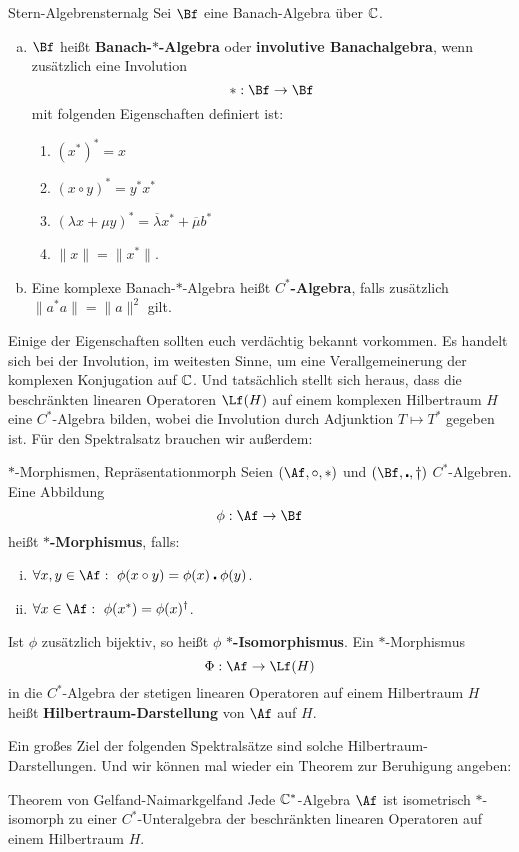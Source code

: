 \begin{definition}{Stern-Algebren}{sternalg}
Sei $\Bf$ eine Banach-Algebra über $\mathbb{C}$.
\begin{enumerate}[(a)]
\item $\Bf$ heißt \textbf{Banach-$\ast$-Algebra} oder \textbf{involutive Banachalgebra}, wenn zusätzlich eine Involution \[ \ast: \Bf \to \Bf \] mit folgenden Eigenschaften definiert ist:
	\begin{enumerate}[({*}1)]
		\item $(x^\ast)^\ast = x$
		\item $(x \circ y)^\ast = y^\ast x^\ast$
		\item $(\lambda x + \mu y)^\ast = \overline{\lambda} x^\ast + \overline{\mu} b^\ast$
		\item $\|x\|=\|x^\ast\|$.
	\end{enumerate}
\item Eine komplexe Banach-$\ast$-Algebra heißt \textbf{$C^\ast$-Algebra}, falls zusätzlich $\|a^\ast a\| = \|a\|^2$ gilt.
\end{enumerate}
\end{definition}
Einige der Eigenschaften sollten euch verdächtig bekannt vorkommen. Es handelt sich bei der Involution, im weitesten Sinne, um eine Verallgemeinerung der komplexen Konjugation auf $\mathbb{C}$. Und tatsächlich stellt sich heraus, dass die beschränkten linearen Operatoren $\Lf(H)$ auf einem komplexen Hilbertraum $H$ eine $C^\ast$-Algebra bilden, wobei die Involution durch Adjunktion $T \mapsto T^\ast$ gegeben ist. Für den Spektralsatz brauchen wir außerdem:

\begin{definition}{$\ast$-Morphismen, Repräsentation}{morph}
Seien $(\Af, \circ, \ast)$ und $(\Bf, \centerdot, \dagger)$ $C^\ast$-Algebren. Eine Abbildung \[ \phi: \Af \to \Bf \] heißt \textbf{$\ast$-Morphismus}, falls:
\begin{enumerate}[(i)]
\item $\forall x,y \in \Af: \ \phi(x \circ y) = \phi(x) \centerdot \phi(y)$.
\item $\forall x \in \Af: \ \phi(x^\ast) = \phi(x)^\dagger$.
\end{enumerate}
Ist $\phi$ zusätzlich bijektiv, so heißt $\phi$ \textbf{$\ast$-Isomorphismus}. Ein $\ast$-Morphismus
\[ \Phi: \Af \to \Lf(H) \] in die $C^\ast$-Algebra der stetigen linearen Operatoren auf einem Hilbertraum $H$ heißt \textbf{Hilbertraum-Darstellung} von $\Af$ auf $H$.
\end{definition}
Ein großes Ziel der folgenden Spektralsätze sind solche Hilbertraum-Darstellungen. Und wir können mal wieder ein Theorem zur Beruhigung angeben:
\begin{theorem}{Theorem von Gelfand-Naimark}{gelfand}
Jede $\mathbb{C}^\ast$-Algebra $\Af$ ist isometrisch $\ast$-isomorph zu einer $C^\ast$-Unteralgebra der beschränkten linearen Operatoren auf einem Hilbertraum $H$.
\end{theorem}
